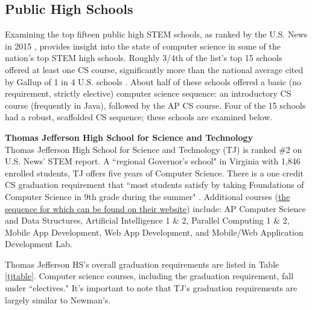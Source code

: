 \subsection{Public High Schools}
Examining the top fifteen public high STEM schools, as ranked by the U.S. News in 2015 \cite{usnews}, provides insight into the state of computer science in some of the nation's top STEM high schools. Roughly 3/4th of the list's top 15 schools offered at least one CS course, significantly more than the national average cited by Gallup of 1 in 4 U.S. schools \cite{gallup}. About half of these schools offered a basic (no requirement, strictly elective) computer science sequence: an introductory CS course (frequently in Java), followed by the AP CS course. Four of the 15 schools had a robust, scaffolded CS sequence; these schools are examined below. \par
\textbf{Thomas Jefferson High School for Science and Technology} \\
Thomas Jefferson High School for Science and Technology (TJ) is ranked \#2 on U.S. News' STEM report. A ``regional Governor's school" in Virginia with 1,846 enrolled students, TJ offers five years of Computer Science. There is a one credit CS graduation requirement that ``most students satisfy by taking Foundations of Computer Science in 9th grade during the summer" \cite{tjreq}. Additional courses (\href{https://www.tjhsst.edu/research-academics/math-cs/computer-science/docs/FlowCS1516.pdf}{the sequence for which can be found on their website}) include: AP Computer Science and Data Structures, Artificial Intelligence 1 \& 2, Parallel Computing 1 \& 2, Mobile App Development, Web App Development, and Mobile/Web Application Development Lab.\par
Thomas Jefferson HS's overall graduation requirements are listed in Table \ref{tjtable}. Computer science courses, including the graduation requirement, fall under ``electives." It's important to note that TJ's graduation requirements are largely similar to Newman's. \par
